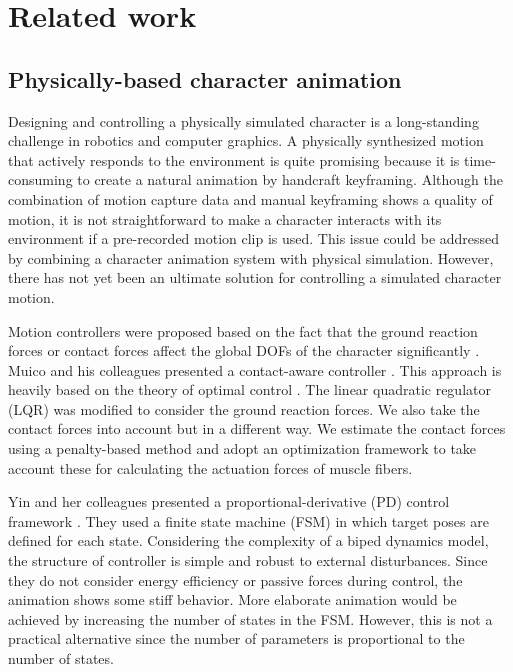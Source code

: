 \documentclass[master,english,final]{kaist-ucs}
\begin{document}
\chapter{Related work}

\section{Physically-based character animation}
Designing and controlling a physically simulated character is a long-standing
challenge in robotics and computer graphics. A physically
synthesized motion that actively responds to the environment is quite
promising because it is time-consuming to create a natural animation by handcraft keyframing.
Although the combination of motion capture data and manual keyframing
shows a quality of motion, it is not straightforward to make a character
interacts with its environment if a pre-recorded motion clip is used.
This issue could be addressed by combining  a character animation system with physical simulation.
However, there has not yet been an ultimate solution for controlling
a simulated character motion.

Motion controllers were proposed based on the fact
that the ground reaction forces or contact forces affect the global
DOFs of the character significantly \cite{SCA07:249-258:2007, journals/tog/MuicoLPP09}.
Muico and his colleagues
presented a contact-aware controller \cite{journals/tog/MuicoLPP09}.
This approach is
heavily based on the theory of optimal control \cite{lewis}.
The linear quadratic regulator (LQR) was modified to consider the ground reaction forces.
We also take the contact forces into account but in a different way.
We estimate the contact forces using a penalty-based method and adopt an optimization
framework to take account these for calculating the actuation forces of muscle fibers.

Yin and her colleagues
presented a proportional-derivative (PD) control framework \cite{journals/tog/YinLP07}.
They used a finite state machine (FSM) in which target poses are defined
for each state. Considering the complexity of a biped dynamics model,
the structure of controller is simple and robust to external disturbances.
Since they do not consider energy efficiency or passive forces during
control, the animation shows some stiff behavior.
More elaborate animation would be achieved by increasing
the number of states in the FSM. However, this is not a practical alternative
since the number of parameters is proportional to the number of states.
\end{document}
